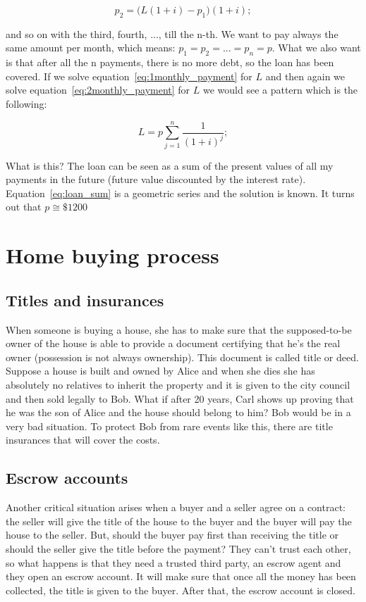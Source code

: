 \begin{equation}\label{eq:2monthly_payment}
p_2 = \bigg(L(1+i) - p_1\bigg)(1+i);
\end{equation}

and so on with the third, fourth, ..., till the n-th.
We want to pay always the same amount per month, which means: $p_1 = p_2 = ... = p_n = p$. What we also want is that after all the n payments, there is no more debt, so the loan has been covered. If we solve equation~\ref{eq:1monthly_payment} for $L$ and then again we solve equation~\ref{eq:2monthly_payment} for $L$ we would see a pattern which is the following:

\begin{equation}\label{eq:loan_sum}
L = p\sum_{j=1}^{n} \dfrac{1}{(1+i)^j};
\end{equation}

What is this? The loan can be seen as a sum of the present values of all my payments in the future (future value discounted by the interest rate). Equation~\ref{eq:loan_sum} is a geometric series and the solution is known. It turns out that $p \cong \$1200$ 

\section{Home buying process}

\subsection{Titles and insurances}
When someone is buying a house, she has to make sure that the supposed-to-be owner of the house is able to provide a document certifying that he's the real owner (possession is not always ownership). This document is called title or deed. Suppose a house is built and owned by Alice and when she dies she has absolutely no relatives to inherit the property and it is given to the city council and then sold legally to Bob. What if after 20 years, Carl shows up proving that he was the son of Alice and the house should belong to him? Bob would be in a very bad situation. To protect Bob from rare events like this, there are title insurances that will cover the costs.

\subsection{Escrow accounts}
Another critical situation arises when a buyer and a seller agree on a contract: the seller will give the title of the house to the buyer and the buyer will pay the house to the seller. But, should the buyer pay first than receiving the title or should the seller give the title before the payment? They can't trust each other, so what happens is that they need a trusted third party, an escrow agent and they open an escrow account. It will make sure that once all the money has been collected, the title is given to the buyer. After that, the escrow account is closed.
